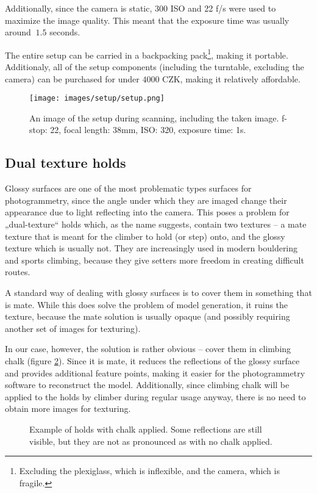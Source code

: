 Additionally, since the camera is static, 300 ISO and 22 f/s were used to maximize the image quality.
This meant that the exposure time was usually around $~1.5$ seconds.

The entire setup can be carried in a backpacking pack\footnote{Excluding the plexiglass, which is inflexible, and the camera, which is fragile.}, making it portable.
Additionaly, all of the setup components (including the turntable, excluding the camera) can be purchased for under $4000$ CZK, making it relatively affordable.

\begin{figure}
	\centering
	\texttt{[image: images/setup/setup.png]}
	\caption{An image of the setup during scanning, including the taken image. f-stop: 22, focal length: 38mm, ISO: 320, exposure time: 1s.}
	  
	\label{fig:setup}
\end{figure}

\subsection{Dual texture holds}
Glossy surfaces are one of the most problematic types surfaces for photogrammetry, since the angle under which they are imaged change their appearance due to light reflecting into the camera.
This poses a problem for „dual-texture“ holds which, as the name suggests, contain two textures -- a mate texture that is meant for the climber to hold (or step) onto, and the glossy texture which is usually not.
They are increasingly used in modern bouldering and sports climbing, because they give setters more freedom in creating difficult routes.

A standard way of dealing with glossy surfaces is to cover them in something that is mate.
While this does solve the problem of model generation, it ruins the texture, because the mate solution is usually opaque (and possibly requiring another set of images for texturing).

In our case, however, the solution is rather obvious -- cover them in climbing chalk (figure \ref{fig:chalk}).
Since it is mate, it reduces the reflections of the glossy surface and provides additional feature points, making it easier for the photogrammetry software to reconstruct the model.
Additionally, since climbing chalk will be applied to the holds by climber during regular usage anyway, there is no need to obtain more images for texturing.

\begin{figure}
	\centering
	\hfill
	\hfill
	\caption{Example of holds with chalk applied. Some reflections are still visible, but they are not as pronounced as with no chalk applied.}%
	\label{fig:chalk}
\end{figure}

